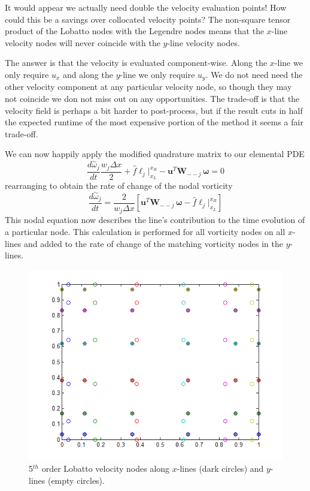 \documentclass[letterpaper,12pt]{report}
\newcommand{\ben}[1]{\begin{equation}\label{#1}}
\newcommand{\ee}{\end{equation}}
\newcommand{\aomega}{\overset{\sim}{\omega}}				%
\begin{document}
It would appear we actually need double the velocity evaluation points! How could this be a savings over collocated velocity points? The non-square tensor product of the Lobatto nodes with the Legendre nodes means that the $x$-line velocity nodes will never coincide with the $y$-line velocity nodes.

The answer is that the velocity is evaluated component-wise. Along the $x$-line we only require $u_x$ and along the $y$-line we only require $u_y$. We do not need need the other velocity component at any particular velocity node, so though they may not coincide we don not miss out on any opportunities. The trade-off is that the velocity field is perhaps a bit harder to post-process, but if the result cuts in half the expected runtime of the most expensive portion of the method it seems a fair trade-off.

We can now happily apply the modified quadrature matrix to our elemental PDE
\ben{DGJoshTemp3} \frac{d \aomega_j}{dt} \frac{w_j \Delta x}{2}
+\hat{f}\ell_j \Big|^{x_R}_{x_L} 
- \mathbf{u}^T \mathbf{W}_{--j} \, \boldsymbol{\omega} = 0 \ee
rearranging to obtain the rate of change of the nodal vorticity
\ben{DGJosh} \frac{d \aomega_j}{dt}
=\frac{2}{w_j \Delta x} \left[\mathbf{u}^T \mathbf{W}_{--j} \, \boldsymbol{\omega} - \hat{f}\ell_j \Big|^{x_R}_{x_L}\right]  \ee
This nodal equation now describes the line's contribution to the time evolution of a particular node. This calculation is performed for all vorticity nodes on all $x$-lines and added to the rate of change of the matching vorticity nodes in the $y$-lines.

\begin{figure}
\centering
\includegraphics[width=5.5in]{VelocityLobatto.PNG}
\caption{\label{fig:VelocityLobatto}5$^{th}$ order Lobatto velocity nodes along $x$-lines (dark circles) and $y$-lines (empty circles).}
\end{figure}
\end{document}
